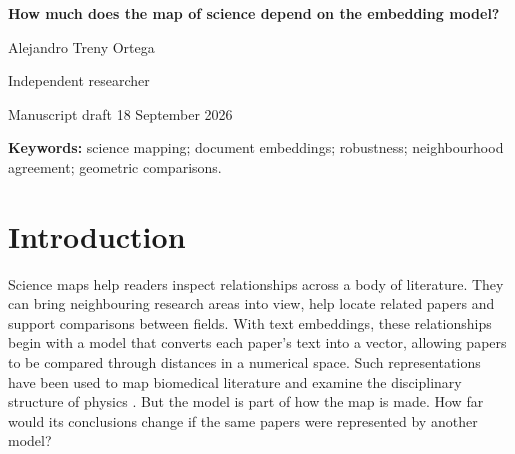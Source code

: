 \documentclass[12pt]{article}
\begin{document}
\begin{center}
{\LARGE\bfseries How much does the map of science depend on the embedding model?\par}
\vspace{12pt}
{\large Alejandro Treny Ortega\par}
\smallskip
Independent researcher\par
\medskip
{\small Manuscript draft \textbullet{} 18 September 2026\par}
\end{center}

\begin{abstract}
Document embeddings make it possible to map scientific literature, but conclusions drawn from their geometry may depend on the model used. This study compares ten embedding models on a fixed corpus of 500,000 OpenAlex records from 26 fields and 2000--2024. Matched panels separate agreement between field centres, within fields and among nearest neighbours; further comparisons vary text input and representation settings. Models share broad structure, yet retain only 30.3\% of the 25 nearest neighbours on average within field-period groups. Removing abstracts changes neighbours about as much as changing the model, whereas removing titles changes less. An exploratory analysis of all 325 field pairs identifies persistent opposite orderings across models in 262 pairs for angular spread and 221 for effective linear dimension. Requiring a relative difference above 5\% reduces these counts to 96 and 177. Alternative measures preserve many oppositions, although centring and pooling matter. These results concern geometric properties, not thematic correctness. Repeating article selection can establish a stable result within a model while leaving its direction dependent on the representation. Science-mapping studies should therefore test the specific comparison they intend to interpret, alongside overall map agreement.
\end{abstract}
\textbf{Keywords:} science mapping; document embeddings; robustness; neighbourhood agreement; geometric comparisons.

\section{Introduction}
Science maps help readers inspect relationships across a body of literature. They can bring neighbouring research areas into view, help locate related papers and support comparisons between fields. With text embeddings, these relationships begin with a model that converts each paper's text into a vector, allowing papers to be compared through distances in a numerical space. Such representations have been used to map biomedical literature and examine the disciplinary structure of physics \citep{refbe130e2973,refc0e2cc29e0}. But the model is part of how the map is made. How far would its conclusions change if the same papers were represented by another model?
\end{document}
